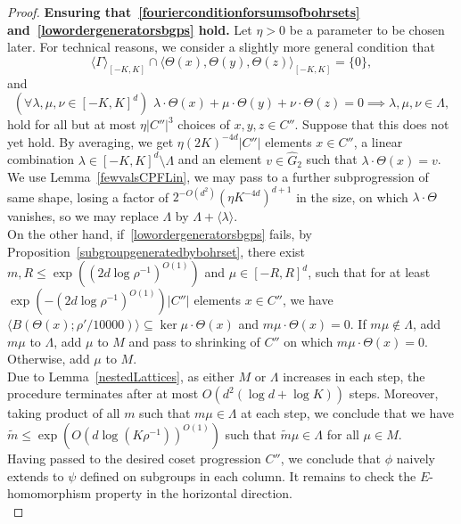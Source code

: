 \documentclass[a4paper,11pt]{article}
\numberwithin{theorem}{section}
\theoremstyle{definition}
\newcommand{\on}[1]{
	\operatorname{#1}
}
\begin{document}
\begin{proof}
    \noindent\textbf{Ensuring that~\eqref{fourierconditionforsumsofbohrsets} and~\eqref{lowordergeneratorsbgps} hold.} Let $\eta > 0$ be a parameter to be chosen later. For technical reasons, we consider a slightly more general condition that 
    \begin{equation}\langle \Gamma \rangle_{[-K, K]} \cap \langle \Theta(x), \Theta(y), \Theta(z)\rangle_{[-K, K]} = \{0\},\label{fourierconditionforsumsofbohrsets2}\end{equation}
    and 
    \begin{equation}(\forall \lambda, \mu, \nu \in [-K, K]^d) \,\, \lambda \cdot \Theta(x) + \mu \cdot \Theta(y) + \nu \cdot \Theta(z) = 0\implies \lambda , \mu, \nu \in \Lambda,\label{fourierconditionforsumsofbohrsets3}\end{equation}
    hold for all but at most $\eta |C''|^3$ choices of $x,y,z \in C''$. Suppose that this does not yet hold. By averaging, we get $\eta (2K)^{-4d}|C''|$ elements $x \in C''$, a linear combination $\lambda \in [-K, K]^d \setminus \Lambda$ and an element $v \in \hat{G}_2$ such that $\lambda \cdot \Theta(x) = v$. We use Lemma~\ref{fewvalsCPFLin}, we may pass to a further subprogression of same shape, losing a factor of $2^{-O(d^2)}(\eta K^{-4d})^{d + 1}$ in the size, on which $\lambda \cdot \Theta$ vanishes, so we may replace $\Lambda$ by $\Lambda + \langle \lambda \rangle$.\\ 
    On the other hand, if~\eqref{lowordergeneratorsbgps} fails, by Proposition~\ref{subgroupgeneratedbybohrset}, there exist $m, R \leq \exp((2d \log \rho^{-1})^{O(1)})$ and $\mu \in [-R, R]^d$, such that for at least $\exp(-(2d \log \rho^{-1})^{O(1)})|C''|$ elements $x \in C''$, we have 
    $\langle B(\Theta(x); \rho'/10000)\rangle \subseteq \on{ker} \mu \cdot \Theta(x)$ and  $m \mu \cdot \Theta(x) = 0$. If $m \mu \notin \Lambda$, add $m \mu$ to $\Lambda$, add $\mu$ to $M$ and pass to shrinking of $C''$ on which $m\mu \cdot \Theta(x) = 0$. Otherwise, add $\mu$ to $M$.\\
    
    Due to Lemma~\ref{nestedLattices}, as either $M$ or $\Lambda$ increases in each step, the procedure terminates after at most $O(d^2 (\log d + \log K))$ steps. Moreover, taking product of all $m$ such that $m\mu \in \Lambda$ at each step, we conclude that we have $\tilde{m} \leq \exp(O(d \log (K \rho^{-1}))^{O(1)})$ such that $\tilde{m} \mu \in \Lambda$ for all $\mu \in M$.\\
    
    Having passed to the desired coset progression $C''$, we conclude that $\phi$ naively extends to $\psi$ defined on subgroups in each column. It remains to check the $E$-homomorphism property in the horizontal direction.\\
    

\end{proof}
\end{document}
